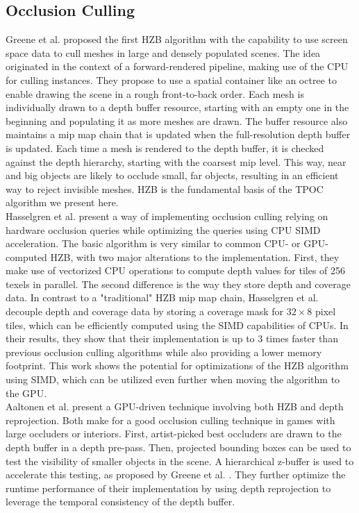 \documentclass[conference]{IEEEtran}
\begin{document}
\subsection{Occlusion Culling} \label{subsec-occlusion-culling}

\noindent
Greene et al. \cite{b1} proposed the first \ac{HZB} algorithm with the capability to use 
screen space data to cull meshes in large and densely populated scenes. The idea originated 
in the context of a forward-rendered pipeline, making use of the \ac{CPU} for culling instances. 
They propose to use a spatial container like an octree to enable drawing the scene in a rough 
front-to-back order. Each mesh is individually drawn to a depth buffer resource, starting with 
an empty one in the beginning and populating it as more meshes are drawn. The buffer resource 
also maintains a mip map chain that is updated when the full-resolution depth buffer is updated. 
Each time a mesh is rendered to the depth buffer, it is checked against the depth hierarchy, 
starting with the coarsest mip level. This way, near and big objects are likely to occlude small, 
far objects, resulting in an efficient way to reject invisible meshes. \ac{HZB} is the 
fundamental basis of the \ac{TPOC} algorithm we present here.\\

\noindent
Hasselgren et al. \cite{b3} present a way of implementing occlusion culling relying on hardware 
occlusion queries while optimizing the queries using \ac{CPU} \ac{SIMD} acceleration. The basic 
algorithm is very similar to common \ac{CPU}- or \ac{GPU}-computed \ac{HZB}, with two major 
alterations to the implementation. 
First, they make use of vectorized \ac{CPU} operations to compute depth values for tiles of 256 
texels in parallel. The second difference is the way they store depth and coverage data. In contrast 
to a "traditional" \ac{HZB} mip map chain, Hasselgren et al. decouple depth and coverage data by 
storing a coverage mask for $32 \times 8$ pixel tiles, which can be efficiently computed using 
the \ac{SIMD} capabilities of \ac{CPU}s. In their results, they show that their implementation is 
up to 3 times faster than previous occlusion culling algorithms while also providing a lower memory 
footprint. This work shows the potential for optimizations of the \ac{HZB} algorithm using \ac{SIMD}, 
which can be utilized even further when moving the algorithm to the \ac{GPU}. \\

\noindent
Aaltonen et al. \cite{b4} present a \ac{GPU}-driven technique involving both \ac{HZB} and depth 
reprojection. Both make for a good occlusion culling technique in games with large occluders or 
interiors. First, artist-picked best occluders are drawn to the depth buffer in a depth pre-pass. 
Then, projected bounding boxes can be used to test the visibility of smaller objects in the scene. 
A hierarchical z-buffer is used to accelerate this testing, as proposed by Greene et al. \cite{b1}. 
They further optimize the runtime performance of their implementation by using depth reprojection 
to leverage the temporal consistency of the depth buffer. \\
\end{document}
